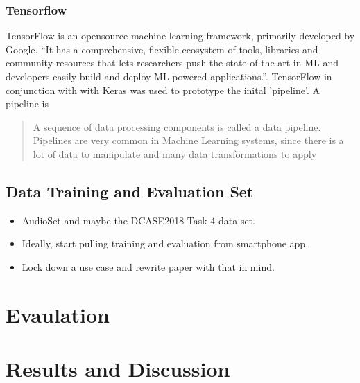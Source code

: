 \documentclass{UoNMCHA}
\newcommand{\inlineQuote}[1]{``#1''}
\numberwithin{equation}{section}
\begin{document}
\subsubsection{Tensorflow}
TensorFlow is an opensource machine learning framework, primarily developed by Google.
\inlineQuote{It has a comprehensive, flexible ecosystem of tools, libraries and community resources that lets researchers push the state-of-the-art in ML and developers easily build and deploy ML powered applications.}\citep{TFwebsite}. TensorFlow in conjunction with with Keras was used to prototype the inital 'pipeline'. A pipeline is \begin{quote}
A sequence of data processing components is called a data pipeline. Pipelines are very
common in Machine Learning systems, since there is a lot of data to manipulate and
many data transformations to apply
\end{quote} \cite{HandsOnMLTextbook}



\subsection{Data Training and Evaluation Set}
\begin{itemize}
    \item AudioSet and maybe the DCASE2018 Task 4 data set.
    \item Ideally, start pulling training and evaluation from smartphone app. 
    \item Lock down a use case and rewrite paper with that in mind.
\end{itemize}

\section{Evaulation}


\section{Results and Discussion}
\end{document}

